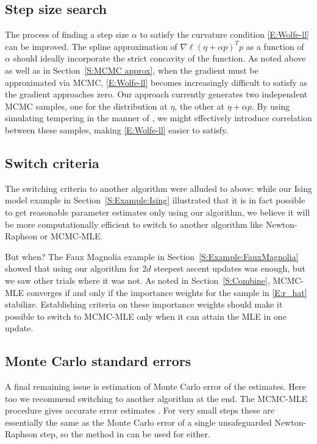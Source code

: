 \subsection{Step size search}
The process of finding a step size $\alpha$ to satisfy the curvature condition
 \eqref{E:Wolfe-ll} can be improved.
The spline approximation of $\nabla \ell(\eta + \alpha p)^T p$ as a function of $\alpha$ should 
ideally incorporate the strict concavity of the function.  
As noted above as well as in Section~\ref{S:MCMC approx}, when the gradient must be approximated
via MCMC, 
\eqref{E:Wolfe-ll} becomes increasingly difficult to satisfy as the gradient approaches zero.
Our approach currently generates two independent MCMC samples, one for
the distribution at $\eta$, the other at $\eta + \alpha p$.  By using simulating tempering
in the manner of \citet{Geyer:1995}, we might effectively introduce correlation between these
samples, making \eqref{E:Wolfe-ll} easier to satisfy.  

\subsection{Switch criteria}
The switching criteria to another algorithm were alluded to above: while our Ising model example
in Section~\ref{S:Example:Ising} illustrated that it is in fact possible to get reasonable 
parameter estimates only using our algorithm, we believe it will be more computationally
efficient to switch to another algorithm like Newton-Raphson or MCMC-MLE.  

But when?  
The Faux Magnolia example in Section~\ref{S:Example:FauxMagnolia} showed that using 
our algorithm for $2d$ steepest ascent updates was enough, but we saw other trials where
it was not.
As noted in Section~\ref{S:Combine}, MCMC-MLE converges if and only 
if the importance weights for the sample in \eqref{E:r_hat} stabilize.  
Establishing criteria on these importance weights should make it 
possible to switch to MCMC-MLE only when it can attain the MLE in one update.

\subsection{Monte Carlo standard errors}
 A final remaining issue is estimation of Monte Carlo error of the estimates.  
 Here too we recommend switching to another
algorithm at the end.  The MCMC-MLE procedure gives accurate error estimates \citep{Geyer:1994,Hunter:2006}.
For very small steps these are essentially the same as the Monte Carlo error of a single unsafeguarded Newton-Raphson step,
so the method in \citep{Geyer:1994} can be used for either.




